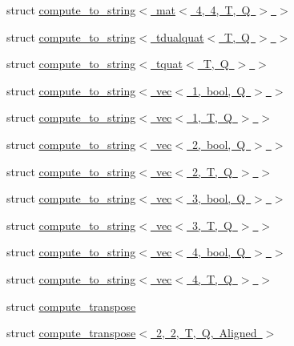 \begin{DoxyCompactItemize}
\item 
struct \mbox{\hyperlink{structglm_1_1detail_1_1compute__to__string_3_01mat_3_014_00_014_00_01_t_00_01_q_01_4_01_4}{compute\+\_\+to\+\_\+string$<$ mat$<$ 4, 4, T, Q $>$ $>$}}
\item 
struct \mbox{\hyperlink{structglm_1_1detail_1_1compute__to__string_3_01tdualquat_3_01_t_00_01_q_01_4_01_4}{compute\+\_\+to\+\_\+string$<$ tdualquat$<$ T, Q $>$ $>$}}
\item 
struct \mbox{\hyperlink{structglm_1_1detail_1_1compute__to__string_3_01tquat_3_01_t_00_01_q_01_4_01_4}{compute\+\_\+to\+\_\+string$<$ tquat$<$ T, Q $>$ $>$}}
\item 
struct \mbox{\hyperlink{structglm_1_1detail_1_1compute__to__string_3_01vec_3_011_00_01bool_00_01_q_01_4_01_4}{compute\+\_\+to\+\_\+string$<$ vec$<$ 1, bool, Q $>$ $>$}}
\item 
struct \mbox{\hyperlink{structglm_1_1detail_1_1compute__to__string_3_01vec_3_011_00_01_t_00_01_q_01_4_01_4}{compute\+\_\+to\+\_\+string$<$ vec$<$ 1, T, Q $>$ $>$}}
\item 
struct \mbox{\hyperlink{structglm_1_1detail_1_1compute__to__string_3_01vec_3_012_00_01bool_00_01_q_01_4_01_4}{compute\+\_\+to\+\_\+string$<$ vec$<$ 2, bool, Q $>$ $>$}}
\item 
struct \mbox{\hyperlink{structglm_1_1detail_1_1compute__to__string_3_01vec_3_012_00_01_t_00_01_q_01_4_01_4}{compute\+\_\+to\+\_\+string$<$ vec$<$ 2, T, Q $>$ $>$}}
\item 
struct \mbox{\hyperlink{structglm_1_1detail_1_1compute__to__string_3_01vec_3_013_00_01bool_00_01_q_01_4_01_4}{compute\+\_\+to\+\_\+string$<$ vec$<$ 3, bool, Q $>$ $>$}}
\item 
struct \mbox{\hyperlink{structglm_1_1detail_1_1compute__to__string_3_01vec_3_013_00_01_t_00_01_q_01_4_01_4}{compute\+\_\+to\+\_\+string$<$ vec$<$ 3, T, Q $>$ $>$}}
\item 
struct \mbox{\hyperlink{structglm_1_1detail_1_1compute__to__string_3_01vec_3_014_00_01bool_00_01_q_01_4_01_4}{compute\+\_\+to\+\_\+string$<$ vec$<$ 4, bool, Q $>$ $>$}}
\item 
struct \mbox{\hyperlink{structglm_1_1detail_1_1compute__to__string_3_01vec_3_014_00_01_t_00_01_q_01_4_01_4}{compute\+\_\+to\+\_\+string$<$ vec$<$ 4, T, Q $>$ $>$}}
\item 
struct \mbox{\hyperlink{structglm_1_1detail_1_1compute__transpose}{compute\+\_\+transpose}}
\item 
struct \mbox{\hyperlink{structglm_1_1detail_1_1compute__transpose_3_012_00_012_00_01_t_00_01_q_00_01_aligned_01_4}{compute\+\_\+transpose$<$ 2, 2, T, Q, Aligned $>$}}

\end{DoxyCompactItemize}
